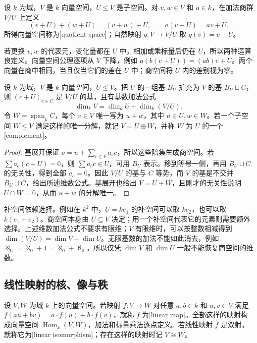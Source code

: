 \begin{definition}\label{b2:def:quotient-vector-space}
	设 \(k\) 为域，\(V\) 是 \(k\) 向量空间，\(U\le V\) 是子空间。对 \(v,w\in V\) 和 \(a\in k\)，在加法商群 \(V/U\) 上定义
	\[
		(v+U)+(w+U)=(v+w)+U,\qquad a(v+U)=av+U.
	\]
	所得向量空间称为[quotient space]；自然映射 \(q:V\to V/U\) 取 \(q(v)=v+U\)。
\end{definition}

若更换 \(v,w\) 的代表元，变化量都在 \(U\) 中，相加或乘标量后仍在 \(U\)，所以两种运算良定义。向量空间公理逐项从 \(V\) 下降，例如 \(a(b(v+U))=(ab)v+U\)。两个向量在商中相同，当且仅当它们的差在 \(U\) 中；商空间将 \(U\) 内的差别视为零。

\begin{proposition}\label{b2:prop:quotient-basis}
	设 \(k\) 为域，\(V\) 是 \(k\) 向量空间，\(U\le V\)。把 \(U\) 的一组基 \(B_U\) 扩充为 \(V\) 的基 \(B_U\sqcup C\)，则 \((c+U)_{c\in C}\) 是 \(V/U\) 的基，且有基数加法公式
	\[
		\dim_kV=\dim_kU+\dim_k(V/U).
	\]
	令 \(W=\operatorname{span}_kC\)，每个 \(v\in V\) 唯一写为 \(u+w\)，其中 \(u\in U,w\in W\)。若一个子空间 \(W\le V\) 满足这样的唯一分解，就记 \(V=U\oplus W\)，并称 \(W\) 为 \(U\) 的一个[complement]。
\end{proposition}
\begin{proof}
	基展开保证 \(v=u+\sum_{c\in F}a_cc\)，所以这些陪集生成商空间。若 \(\sum a_c(c+U)=0\)，则 \(\sum a_cc\in U\)，可用 \(B_U\) 表示。移到等号一侧，再用 \(B_U\sqcup C\) 的无关性，得到全部 \(a_c=0\)。因此 \(V/U\) 的基与 \(C\) 等势，而 \(V\) 的基是不交并 \(B_U\sqcup C\)，给出所述维数公式。基展开也给出 \(V=U+W\)，且刚才的无关性说明 \(U\cap W=0\)，从而 \(u+w\) 的分解唯一。
\end{proof}

补空间依赖选择。例如在 \(k^2\) 中，\(U=ke_1\) 的补空间可以取 \(ke_2\)，也可以取 \(k(e_1+e_2)\)。商空间本身由 \(U\subseteq V\) 决定；用一个补空间代表它的元素则需要额外选择。上述维数加法公式不要求有限维；\(V\) 有限维时，可以按整数相减得到 \(\dim(V/U)=\dim V-\dim U\)。无限基数的加法不能如此消去，例如 \(\aleph_0=\aleph_0+1=\aleph_0+\aleph_0\)，所以仅凭 \(\dim V\) 和 \(\dim U\) 一般不能恢复商空间的维数。

\subsection{线性映射的核、像与秩}
\label{b2:subsec:0101:03}

\begin{definition}\label{b2:def:linear-map}
	设 \(V,W\) 为域 \(k\) 上的向量空间。若映射 \(f:V\to W\) 对任意 \(a,b\in k\) 和 \(u,v\in V\) 满足 \(f(au+bv)=a\cdot f(u)+b\cdot f(v)\)，就称 \(f\) 为[linear map]。全部这样的映射构成向量空间 \(\operatorname{Hom}_k(V,W)\)，加法和标量乘法逐点定义。若线性映射 \(f\) 是双射，就称它为[linear isomorphism]；存在这样的映射时记 \(V\cong W\)。
\end{definition}

